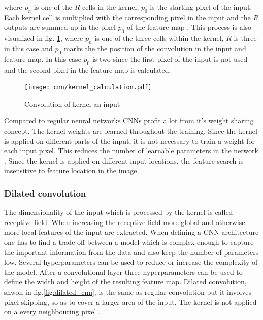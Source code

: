 where $p_{n}$ is one of the $R$ cells in the kernel, $p_{0}$ is the starting pixel of the input. Each kernel cell is multiplied with the corresponding pixel in the input and the $R$ outputs are summed up in the pixel $p_{0}$ of the feature map \cite{Ganesh2019}. This process is also visualized in fig. \ref{fig:kernel}, where $p_{n}$ is one of the three cells within the kernel, $R$ is three in this case and $p_{0}$ marks the the position of the convolution in the input and feature map. In this case $p_{0}$ is two since the first pixel of the input is not used and the second pixel in the feature map is calculated.


\begin{figure}[htpb]
  \centering
  \texttt{[image: cnn/kernel\_calculation.pdf]}
  \caption {Convolution of kernel an input \cite{Ganesh2019}}
  \label{fig:kernel}
\end{figure}

Compared to regular neural networks CNNs profit a lot from it's weight sharing concept. The kernel weights are learned throughout the training. Since the kernel is applied on different parts of the input, it is not necessary to train a weight for each input pixel. This reduces the number of learnable parameters in the network \cite{OShea2015}. Since the kernel is applied on different input locations, the feature search is insensitive to feature location in the image.

\subsubsection{Dilated convolution}

The dimensionality of the input which is processed by the kernel is called receptive field. When increasing the receptive field more global and otherwise more local features of the input are extracted. When defining a CNN architecture one has to find a trade-off between a model which is complex enough to capture the important information from the data and also keep the number of parameters low. Several hyperparameters can be used to reduce or increase the complexity of the model. After a convolutional layer three hyperparameters can be used to define the width and height of the resulting feature map. Dilated convolution, shwon in fig.\ref{fig:dilated_cnn}, is the same as regular convolution but it involves pixel skipping, so as to cover a larger area of the input. The kernel is not applied on a every neighbouring pixel \cite{Ganesh2019}.

